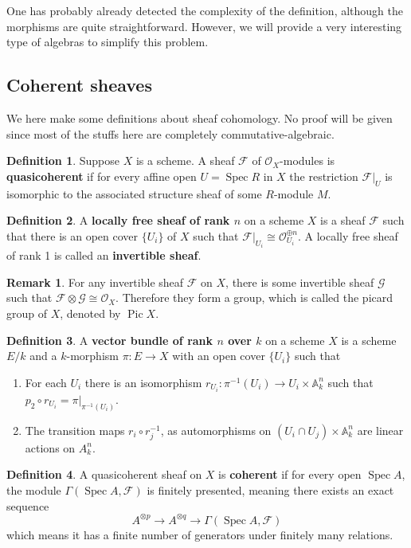\documentclass[12pt]{article}
\theoremstyle{remark}
\theoremstyle{definition}
\newtheorem{remark}{Remark}[section]
\newtheorem{definition}{Definition}[section]
\newcommand{\A}[0]{\mathbb{A}}
\newcommand{\Spec}[0]{\operatorname{Spec}}
\newcommand{\Pic}[0]{\operatorname{Pic}}
\begin{document}
    One has probably already detected the complexity of the definition, although the morphisms are quite straightforward. However, we will provide a very interesting type of algebras to simplify this problem.
    \subsection{Coherent sheaves}
    We here make some definitions about sheaf cohomology. No proof will be given since most of the stuffs here are completely commutative-algebraic.
    \begin{definition}
        Suppose $X$ is a scheme. A sheaf $\mathcal F$ of $\mathcal O_X$-modules is \textbf{quasicoherent} if for every affine open $U=\Spec R$ in $X$ the restriction $\mathcal F|_U$ is isomorphic to the associated structure sheaf of some $R$-module $M$.
    \end{definition}
    \begin{definition}
        A \textbf{locally free sheaf of rank $n$} on a scheme $X$ is a sheaf $\mathcal F$ such that there is an open cover $\{U_i\}$ of $X$ such that $\mathcal F|_{U_i}\cong\mathcal O_{U_i}^{\oplus n}$. A locally free sheaf of rank 1 is called an \textbf{invertible sheaf}.
    \end{definition}
    \begin{remark}
        For any invertible sheaf $\mathcal F$ on $X$, there is some invertible sheaf $\mathcal G$ such that $\mathcal F\otimes\mathcal G\cong\mathcal O_X$. Therefore they form a group, which is called the picard group of $X$, denoted by $\Pic X$.
    \end{remark}
    \begin{definition}
        A \textbf{vector bundle of rank $n$ over $k$} on a scheme $X$ is a scheme $E/k$ and a $k$-morphism $\pi:E\to X$ with an open cover $\{U_i\}$ such that
        \begin{enumerate}[\normalfont(i)]
            \item For each $U_i$ there is an isomorphism $r_{U_i}:\pi^{-1}(U_i)\to U_i\times\A_{k}^n$ such that $p_2\circ r_{U_i}=\pi|_{\pi^{-1}(U_i)}$.
            \item The transition maps $r_i\circ r_j^{-1}$, as automorphisms on $(U_i\cap U_j)\times\A^n_k$ are linear actions on $A_k^n$.
        \end{enumerate}
    \end{definition}
    \begin{definition}
        A quasicoherent sheaf on $X$ is \textbf{coherent} if for every open $\Spec A$, the module $\Gamma(\Spec A, \mathcal F)$ is finitely presented, meaning there exists an exact sequence
        \[A^{\otimes p}\to A^{\otimes q}\to \Gamma(\Spec A, \mathcal F)\]
        which means it has a finite number of generators under finitely many relations.
    \end{definition}
\end{document}
